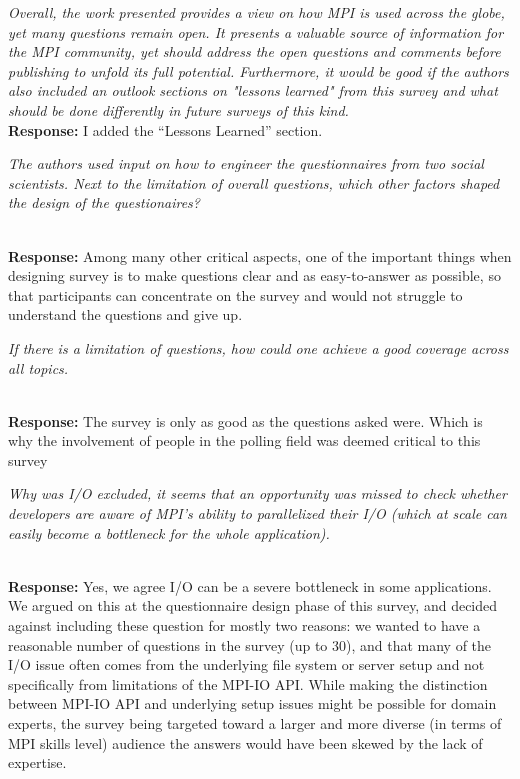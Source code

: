 \documentclass[11pt]{article}
\newcommand{\response}[2]{{\vspace{5mm}\noindent{\bf Comment:} \em #1}\\%
  {\bf Response:} #2}
\newcommand{\iresponse}[2]{{\item \em #1}\\%
  {\bf Response:} #2}
\begin{document}
\response{Overall, the work presented provides a view on how MPI is
  used across the globe, yet many questions remain open. It presents a
  valuable source of information for the MPI community, yet should
  address the open questions and comments before publishing to unfold
  its full potential. Furthermore, it would be good if the authors
  also included an outlook sections on "lessons learned" from this
  survey and what should be done differently in future surveys of this
  kind.}
{
I added the ``Lessons Learned'' section.
}

\begin{enumerate}
\iresponse{The authors used input on how to engineer the questionnaires
  from two social scientists. Next to the limitation of overall
  questions, which other factors shaped the design of the
  questionaires?}
{Among many other critical aspects, one of the important things when designing survey is to make
  questions clear and as easy-to-answer as possible, so that participants can
  concentrate on the survey and would not struggle to understand the questions and give up.}

\iresponse{If there is a limitation of questions, how could one
  achieve a good coverage across all topics.}
{The survey is only as good as the questions asked were. Which is why the involvement of
people in the polling field was deemed critical to this survey}

\iresponse{Why was I/O excluded, it seems that an opportunity was
  missed to check whether developers are aware of MPI's ability to
  parallelized their I/O (which at scale can easily become a
  bottleneck for the whole application).}
{
Yes, we agree I/O can be a severe bottleneck in some applications. We
argued on this at the questionnaire design phase of this survey, and decided
against including these question for mostly two reasons: we wanted to have
a reasonable number of questions in the survey (up to 30), and
that many of the I/O issue often comes from
the underlying file system or server setup and not specifically from limitations of the MPI-IO API.
While making the distinction between MPI-IO API and underlying setup issues might be possible for
domain experts, the survey being targeted toward a larger and more diverse (in terms of
MPI skills level) audience the answers would have been skewed by the lack of expertise.
}
\begin{comment}
 We thought it is very
difficult for some MPI users to distinguish whether the I/O issue comes
from the underlying file system or MPI-IO itself. This can be true
when MPI users are domain experts but they lack system knowledge. And
we decided not to have MPI-IO related questions.
\end{comment}


\end{enumerate}
\end{document}
